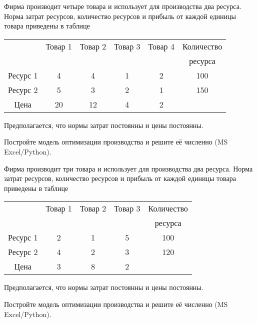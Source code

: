 
\begin{exercise}
Фирма производит четыре товара и использует для производства два ресурса.
Норма затрат ресурсов, количество ресурсов и прибыль от каждой единицы
товара приведены в таблице
\begin{center}
\begin{tabular}{|c|c|c|c|c||c|}
	\hline
	& Товар 1 & Товар 2 & Товар 3 & Товар 4 &  Количество \\
	& & & & &  ресурса \\
	\hline
	Ресурс 1 & 4 & 4 & 1 & 2 & 100\\ \hline
	Ресурс 2 & 5 & 3 & 2 & 1 & 150 \\ \hline \hline
	Цена & 20 & 12 & 4 & 2 &  \\ \hline
\end{tabular}
\end{center}
Предполагается, что нормы затрат постоянны и цены постоянны.

Постройте модель оптимизации производства и решите её численно 
(MS Excel/Python).
\end{exercise}

\begin{exercise}
Фирма производит три товара и использует для производства два ресурса.
Норма затрат ресурсов, количество ресурсов и прибыль от каждой единицы 
товара приведены в таблице
\begin{center}
\begin{tabular}{|c|c|c|c||c|}
	\hline 
	& Товар 1 & Товар 2 & Товар 3 & Количество \\
	& & & & ресурса \\
	\hline
	Ресурс 1 & 2 & 1 & 5 & 100 \\ \hline
	Ресурс 2 & 4 & 2 & 3 & 120 \\ \hline \hline
	Цена & 3 & 8 & 2 & \\ \hline
\end{tabular}
\end{center}
Предполагается, что нормы затрат постоянны и цены постоянны.

Постройте модель оптимизации производства и решите её численно 
(MS Excel/Python).
\end{exercise}

